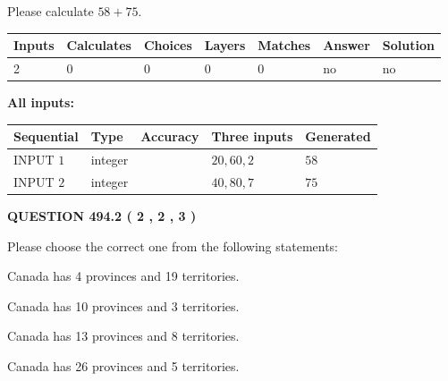 \documentclass[12pt]{article}
\begin{document}
  
 
Please calculate $ %
58 +  %
75 $.
 
 
   
   
   
   
\noindent\begin{tabular}{|l|l|l|l|l|l|l|}
 \hline
Inputs & Calculates & Choices & Layers & Matches & Answer & Solution \\ \hline
 2  & 
 0  & 
 0
  & 
 0  & 
 0  & 
  no & 
  no 
  \\ \hline
 \end{tabular}
   
   
   
   
\noindent{}
   
   
   
   
\noindent\vspace{0.1in}\hspace{-0.08in} {\textbf{\Large{All inputs: }}}
   
   
  
  
\noindent\begin{tabular}{|l|l|l|l|l|}
\hline
 Sequential & Type & Accuracy & Three inputs & Generated \\ 
\hline
 
 
  INPUT $  1 $ & integer &  & $
 20
 , 
 60
 , 
 2
 $ & $ 58 $ 
 \\  \hline  
 
 
  INPUT $  2 $ & integer &  & $
 40
 , 
 80
 , 
 7
 $ & $ 75 $ 
 \\  \hline  
 \end{tabular}
   
   
  
\vspace{0.2in}
  
{\textbf{\Large{QUESTION
494.2 
 ( 2 , 2 , 3 )
}}}
  
  
Please choose the correct one from the following statements:
 
 
Canada has   4 provinces and  19 territories.
 
 
Canada has 10  provinces and 3 territories.
 
 
Canada has  13 provinces and  8 territories.
 
 
Canada has  26 provinces and  5 territories.
 
\end{document}
